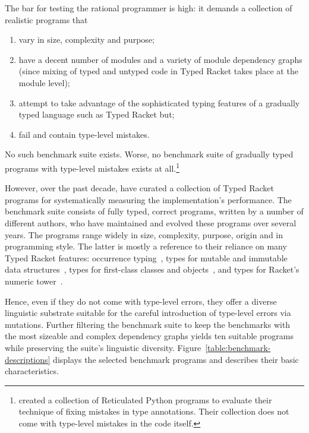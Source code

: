 
The bar for testing the rational programmer is high: it demands a
collection of realistic programs that
\begin{enumerate}
   
  \item vary in size, complexity and purpose; 
    
  \item  have a decent number of modules and a variety of module
    dependency graphs (since mixing of typed and untyped code in Typed
    Racket takes place at the module level);  

  \item attempt to take  advantage of the sophisticated typing features of
    a gradually typed language such as Typed Racket but;

   \item  fail and contain type-level mistakes. 
\end{enumerate}
\noindent
No such benchmark suite exists.  Worse, no benchmark suite of
gradually typed programs with type-level mistakes exists at
all.\footnote{\citet{cc-oopsla-20} created a collection of Reticulated
Python programs to evaluate their technique of fixing mistakes in type
annotations. Their collection does not come with type-level mistakes
in the code itself.} 


However, over the past decade,  \citet{gtnffvf-jfp-2019} have curated a
collection of Typed Racket programs for systematically measuring the
implementation's performance. The benchmark suite consists of fully typed,
correct programs, written by a number of different authors, who have
maintained and evolved these programs over several years. The programs
range widely in size, complexity, purpose, origin and in programming
style. The latter is mostly a reference to their reliance on many Typed
Racket features: occurrence typing~\cite{tf-icfp-2010}, types for mutable
and immutable data structures~\cite{hpst-sfp-2010}, types for first-class
classes and objects~\cite{tsdtf-oopsla-2012}, and types for Racket's
numeric tower~\cite{stathff-padl-12}. 


Hence, even if they do not come with type-level errors, they offer a
diverse linguistic substrate suitable for the careful introduction of
type-level errors via mutations. Further filtering the benchmark suite to
keep the benchmarks with the most sizeable and complex dependency graphs
yields ten suitable programs while preserving the suite's linguistic
diversity. Figure~\ref{table:benchmark-descriptions} displays the selected
benchmark programs and describes their basic characteristics.
